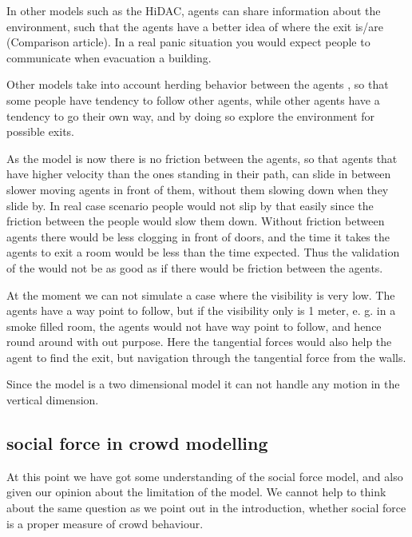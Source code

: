 In other models such as the HiDAC, agents can share information about the 
environment, such that the agents have a better idea of where the exit is/are 
(Comparison article). In a real panic situation you would expect people to 
communicate when evacuation a building.

Other models take into account herding behavior between the agents  
\cite{helbing00}, so that some people have tendency to follow other agents, 
while other agents have a tendency to go their own way,  and by doing so 
explore the environment for possible exits.

As the model is now there is no friction between the agents, so that agents 
that have higher velocity than the ones standing in their path, can slide in 
between slower moving agents in front of them, without them slowing down when 
they slide by. In real case scenario people would not slip by that easily 
since the friction between the people would slow them down.  Without friction 
between agents there would be less clogging in front of doors, and the time it 
takes the agents to exit a room would be less than the time expected. Thus the 
validation of the would not be as good as if there would be friction between 
the agents.

At the moment we can not simulate a case where the visibility is very low. The 
agents have a way point to follow, but if the visibility only is 1 meter, e. 
g. in a smoke filled room, the  agents would not have way point to follow, and 
hence round around with out purpose. Here the tangential forces would also 
help the agent to find the exit, but navigation through the tangential force 
from the walls.

Since the model is a two dimensional model it can not handle any motion in the 
vertical dimension. 

\subsection{social force in crowd modelling}
At this point we have got some understanding of the social force model, and 
also given our opinion about the limitation of the model. We cannot help to 
think about the same question as we point out in the introduction, whether 
social force is a proper measure of crowd behaviour. 

